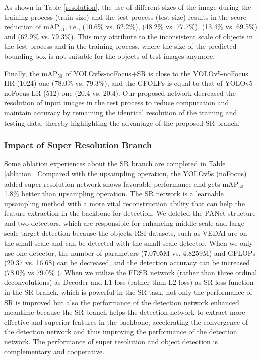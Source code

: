As shown in Table \ref{resolution}, the use of different sizes of the image during the training process (train size) and the test process (test size) results in the score reduction of $\text{mA}{{\text{P}}_{\text{50}}}$, i.e.,  (10.6\% vs. 62.2\%), (48.2\% vs. 77.7\%), (13.4\% vs. 69.5\%) and (62.9\% vs. 79.3\%). This may attribute to the inconsistent scale of objects in the test process and in the training process, where the size of the predicted bounding box is not suitable for the objects of test images anymore. 


Finally, the $\text{mA}{{\text{P}}_{\text{50}}}$ of YOLOv5s-noFocus+SR is close to the YOLOv5-noFocus  HR (1024) one (78.0\% vs. 79.3\%), and the GFOLPs is equal to that of YOLOv5-noFocus LR (512)  one (20.4 vs. 20.4). Our proposed network decreased the resolution of input images in the test process to reduce computation and maintain accuracy by remaining the identical resolution of the training and testing data, thereby highlighting the advantage of the proposed SR branch.

\subsubsection{\textbf{Impact of Super Resolution Branch}}

Some ablation experiences about the SR branch are completed in Table \ref{ablation}. Compared with the upsampling operation, the YOLOv5s (noFocus) added super resolution network shows favorable performance and gets $\text{mA}{{\text{P}}_{\text{50}}}$ 1.8\% better than upsampling operation. The SR network is a learnable upsampling method with a more vital reconstruction ability that can help the feature extraction in the backbone for detection.  We deleted the PANet structure and two detectors, which are responsible for enhancing middle-scale and large-scale target detection because the objects RSI datasets, such as VEDAI are on the small scale and can be detected with the small-scale detector. When we only use one detector, the number of parameters (7.0705M vs. 4.8259M) and GFLOPs (20.37 vs. 16.68) can be decreased, and the detection accuracy can be increased (78.0\%  vs 79.0\% ). When we utilize the EDSR network (rather than three ordinal deconvolutions) as Decoder and L1 loss (rather than L2 loss) as SR loss function in the SR branch, which is powerful in the SR task, not only the performance of SR is improved but also the performance of the detection network enhanced meantime because the SR branch helps the detection network to extract more effective and superior features in the backbone, accelerating the convergence of the detection network and thus improving the performance of the detection network. The performance of super resolution and object detection is complementary and cooperative. 


